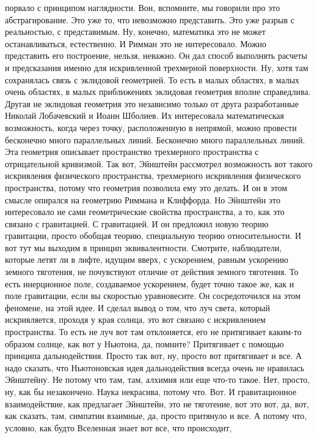 порвало с принципом наглядности. Вон, вспомните, мы говорили про это
абстрагирование. Это уже то, что невозможно представить. Это уже разрыв с
реальностью, с представимым. Ну, конечно, математика это не может
останавливаться, естественно. И Римман это не интересовало. Можно представить
его построение, нельзя, неважно. Он дал способ выполнять расчеты и предсказания
именно для искривленной трехмерной поверхности. Ну, хотя там сохранялась связь с
эклидовой геометрией. То есть в малых областях, в малых очень областях, в малых
приближениях эклидовая геометрия вполне справедлива. Другая не эклидовая
геометрия это независимо только от друга разработанные Николай Лобачевский и
Иоанн Шболиев. Их интересовала математическая возможность, когда через точку,
расположенную в непрямой, можно провести бесконечно много параллельных линий.
Бесконечно много параллельных линий. Эта геометрия описывает пространство
трехмерного пространства с отрицательной кривизмой. Так вот, Эйнштейн рассмотрел
возможность вот такого искривления физического пространства, трехмерного
искривления физического пространства, потому что геометрия позволила ему это
делать. И он в этом смысле опирался на геометрию Риммана и Клиффорда. Но
Эйнштейн это интересовало не сами геометрические свойства пространства, а то,
как это связано с гравитацией. С гравитацией. И он предложил новую теорию
гравитации, просто обобщая теорию, специальную теорию относительности. И вот тут
мы выходим в принцип эквивалентности. Смотрите, наблюдатели, которые летят ли в
лифте, идущим вверх, с ускорением, равным ускорению земного тяготения, не
почувствуют отличие от действия земного тяготения. То есть инерционное поле,
создаваемое ускорением, будет точно такое же, как и поле гравитации, если вы
скоростью уравновесите. Он сосредоточился на этом феномене, на этой идее. И
сделал вывод о том, что луч света, который искривляется, проходя у края солнца,
это вот связано с искривлением пространства. То есть не луч вот там отклоняется,
его не притягивает каким-то образом солнце, как вот у Ньютона, да, помните?
Притягивает с помощью принципа дальнодействия. Просто так вот, ну, просто вот
притягивает и все. А надо сказать, что Ньютоновская идея дальнодействия всегда
очень не нравилась Эйнштейну. Не потому что там, там, алхимия или еще что-то
такое. Нет, просто, ну, как бы незакончено. Наука некрасива, потому что. Вот. И
гравитационное взаимодействие, как предлагает Эйнштейн, это не тяготение, вот
это вот, да, вот, как сказать, там, симпатии взаимные, да, просто притянуло и
все. А потому что, условно, как будто Вселенная знает вот все, что происходит,
